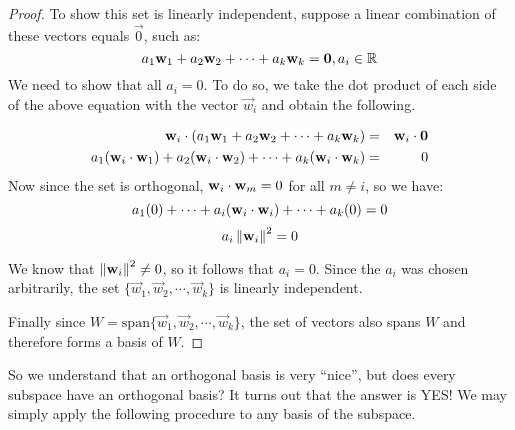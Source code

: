 \documentclass{ximera}
\begin{document}
\begin{proof}
To show this set is linearly independent, suppose a linear combination
of these vectors equals $\vec{0}$, such as:
\[
a_1 \mathbf{w}_1 + a_2 \mathbf{w}_2 + \cdots + a_k \mathbf{w}_k = \mathbf{0}, a_i \in \mathbb{R}
\]
We need to show that all $a_i = 0$. To do so, we take the dot product of
each side of the above equation with the vector $\vec{w}_i$ and obtain the following.

\begin{eqnarray*}
\mathbf{w}_i \cdot (a_1 \mathbf{w}_1 + a_2 \mathbf{w}_2 + \cdots + a_k \mathbf{w}_k ) &=& \mathbf{w}_i \cdot \mathbf{0}\\
a_1 (\mathbf{w}_i \cdot \mathbf{w}_1) + a_2 (\mathbf{w}_i \cdot \mathbf{w}_2) + \cdots + a_k (\mathbf{w}_i \cdot \mathbf{w}_k)  &=& 0
\end{eqnarray*}
Now since the set is orthogonal, $\mathbf{w}_i \cdot \mathbf{w}_m = 0$ for all $m \neq i$, so we have:
\[
a_1 (0) + \cdots + a_i(\mathbf{w}_i \cdot \mathbf{w}_i) + \cdots + a_k (0) = 0
\]
\[
a_i \left\lVert\mathbf{w}_i\right\rVert^2 = 0
\]

We know that $\left\lVert\mathbf{w}_i\right\rVert^2  \neq 0$, so it follows that $a_i =0$. Since the $a_i$ was chosen arbitrarily, the set $\{ \vec{w}_1, \vec{w}_2, \cdots, \vec{w}_k \}$ is linearly independent.

Finally since $W = \mbox{span} \{ \vec{w}_1, \vec{w}_2, \cdots,
\vec{w}_k \}$, the set of vectors also spans $W$ and therefore forms a basis of $W$.

\end{proof}


So we understand that an orthogonal basis is very ``nice'', but does every subspace have an orthogonal basis?  It turns out that the answer is YES!  We may simply apply the following procedure to any basis of the subspace.
\end{document}
